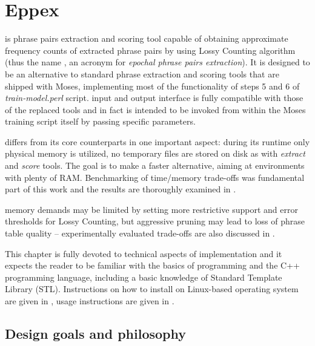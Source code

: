 
\chapter{Eppex}
\label{chap:eppex}

\Eppex{} is phrase pairs extraction and scoring tool capable of obtaining approximate
frequency counts of extracted phrase pairs by using Lossy Counting algorithm
(thus the name \eppex{}, an acronym for \emph{epochal phrase pairs extraction}).
It is designed to be an alternative to standard phrase extraction and scoring tools that
are shipped with Moses, implementing most of the functionality of steps 5 and 6 of
\emph{train-model.perl} script.
\Eppex{} input and output interface is fully compatible with those of the replaced tools
and \eppex{} in fact is intended to be invoked from within the Moses training script itself
by passing specific parameters.

\Eppex{} differs from its core counterparts in one important aspect: during its runtime
only physical memory is utilized, no temporary files are stored on disk as with \emph{extract}
and \emph{score} tools.
The goal is to make \eppex{} a faster alternative, aiming at environments with plenty of RAM.
Benchmarking of time/memory trade-offs was fundamental part of this work and the results are
thoroughly examined in .

\Eppex{} memory demands may be limited by setting more restrictive support and error thresholds
for Lossy Counting, but aggressive pruning may lead to loss of phrase table quality --
experimentally evaluated trade-offs are also discussed in .

This chapter is fully devoted to technical aspects of implementation and it expects the reader
to be familiar with the basics of programming and the C++ programming language, including
a basic knowledge of Standard Template Library (STL).
Instructions on how to install \eppex{} on Linux-based operating system are given in
, usage instructions are given in .

\section{Design goals and philosophy}

